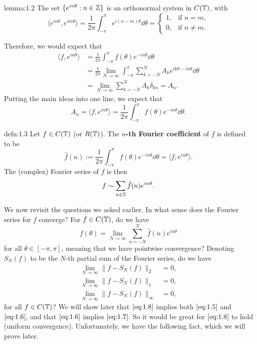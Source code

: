 \begin{lemma}{lemma:1.2}
    The set $\{e^{in\theta} : n \in \mathbb{Z}\}$ is an orthonormal system in 
    $C(\mathbb{T})$, with 
    \[ \langle e^{in\theta}, e^{im\theta} \rangle = \frac{1}{2\pi} 
    \int_{-\pi}^\pi e^{i(n-m)\theta}\dd\theta = \begin{cases} 
        1, & \text{if } n=m, \\ 
        0, & \text{if } n\neq m.
    \end{cases} \] 
\end{lemma}

Therefore, we would expect that 
\begin{align*}
    \langle f, e^{in\theta} \rangle 
    &= \frac{1}{2\pi} \int_{-\pi}^\pi f(\theta)e^{-in\theta}\dd\theta \\ 
    &= \frac{1}{2\pi} \lim_{N\to\infty} \int_{-\pi}^\pi \sum_{k=-N}^N
    A_k e^{ik\theta - in\theta}\dd\theta \\ 
    &= \lim_{N\to\infty} \sum_{k=-N}^N A_k \delta_{kn} = A_n. 
\end{align*}
Putting the main ideas into one line, we expect that 
\[ A_n = \langle f, e^{in\theta} \rangle = \frac{1}{2\pi} \int_{-\pi}^\pi 
f(\theta)e^{-in\theta}\dd\theta. \] 

\begin{defn}{defn:1.3}
    Let $f \in C(\mathbb{T})$ (or $R(\mathbb{T})$). The {\bf $n$-th Fourier coefficient} of 
    $f$ is defined to be 
    \[ \hat f(n) := \frac{1}{2\pi} \int_{-\pi}^\pi f(\theta)e^{-in\theta}\dd\theta = 
    \langle f, e^{in\theta} \rangle. \] 
    The (complex) Fourier series of $f$ is then 
    \[ f \sim \sum_{n\in\mathbb{Z}} \hat f(n)e^{in\theta}. \] 
\end{defn}

We now revisit the questions we asked earlier. In what sense does the 
Fourier series for $f$ converge? For $f \in C(\mathbb{T})$, do we have 
\begin{equation}\label{eq:1.5}
    f(\theta) = \lim_{N\to\infty} \sum_{n=-N}^N \hat f(n)e^{in\theta} 
\end{equation}
for all $\theta \in [-\pi, \pi]$, meaning that we have pointwise convergence? 
Denoting $S_N(f)$ to be the $N$-th partial sum of the Fourier series, do we have 
\begin{align}
    \lim_{N\to\infty} \|f - S_N(f)\|_2 &= 0, \label{eq:1.6} \\ 
    \lim_{N\to\infty} \|f - S_N(f)\|_1 &= 0, \label{eq:1.7} \\ 
    \lim_{N\to\infty} \|f - S_N(f)\|_\infty &= 0, \label{eq:1.8}
\end{align}
for all $f \in C(\mathbb{T})$? We will show later that $\eqref{eq:1.8}$ implies both 
$\eqref{eq:1.5}$ and $\eqref{eq:1.6}$, and that $\eqref{eq:1.6}$ implies 
$\eqref{eq:1.7}$. So it would be great for $\eqref{eq:1.8}$ to hold 
(uniform convergence). Unfortunately, we have the following fact, which 
we will prove later. 

